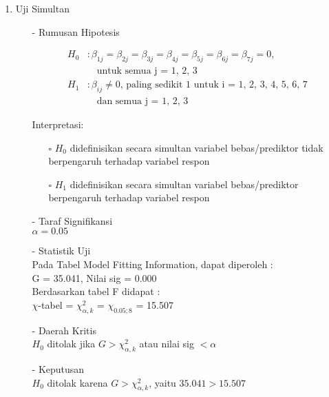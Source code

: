 \begin{enumerate}
    \def\labelenumi{\arabic{enumi}.}
    \tightlist
    \item Uji Simultan
    \begin{test}{
    \begin{enumerate}
        \item[-] Rumusan Hipotesis 
        \begin{fleqn}[\parindent]
            \begin{align*}
            H_0 &: \beta_{1j} = \beta_{2j} = \beta_{3j} = \beta_{4j} = \beta_{5j} = \beta_{6j} = \beta_{7j} = 0, \\  &\quad \text{untuk semua j = 1, 2, 3}\\ 
            H_1 &: \beta_{ij} \neq 0 \text{, paling sedikit 1 untuk i = 1, 2, 3, 4, 5, 6, 7  } \\ &\quad \text{dan semua j = 1, 2, 3}
            \end{align*}
        \end{fleqn}
        Interpretasi:
        \begin{enumerate}
        \item[$\square$] $H_0$ didefinisikan secara simultan variabel bebas/prediktor tidak berpengaruh terhadap variabel respon
        \item[$\square$] $H_1$ didefinisikan secara simultan variabel bebas/prediktor berpengaruh terhadap variabel respon
        \end{enumerate}
    
        \item[-] Taraf Signifikansi \\
        $\alpha = 0.05$
    
        \item[-] Statistik Uji \\
        Pada Tabel Model Fitting Information, dapat diperoleh : \\
        G = 35.041, Nilai sig = 0.000 \\
        Berdasarkan tabel F didapat : \\
        $\chi$-tabel = $\chi_{\alpha, k}^2$ = $\chi_{0.05; 8}$ = 15.507
    
        \item[-] Daerah Kritis \\
        $H_0$ ditolak jika $G > \chi_{\alpha, k}^2$ atau nilai sig $< \alpha$
    
        \item[-] Keputusan \\
        $H_0$ ditolak karena $G > \chi_{\alpha, k}^2$, yaitu $35.041 > 15.507$
    

\end{enumerate}}
\end{test}
\end{enumerate}
